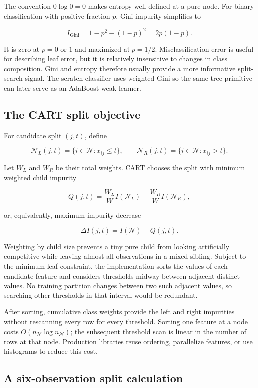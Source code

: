 \documentclass[11pt]{article}
\begin{document}
The convention $0\log 0=0$ makes entropy well defined at a pure node. For
binary classification with positive fraction $p$, Gini impurity simplifies to

\[
 I_{\mathrm{Gini}}=1-p^2-(1-p)^2=2p(1-p).
\]

It is zero at $p=0$ or $1$ and maximized at $p=1/2$. Misclassification error is
useful for describing leaf error, but it is relatively insensitive to changes
in class composition. Gini and entropy therefore usually provide a more
informative split-search signal. The scratch classifier uses weighted Gini so
the same tree primitive can later serve as an AdaBoost weak learner.

\subsection{The CART split objective}

For candidate split $(j,t)$, define

\[
 \mathcal N_L(j,t)=\{i\in\mathcal N:x_{ij}\leq t\},
 \qquad
 \mathcal N_R(j,t)=\{i\in\mathcal N:x_{ij}>t\}.
\]

Let $W_L$ and $W_R$ be their total weights. CART chooses the split with minimum
weighted child impurity

\[
 Q(j,t)=\frac{W_L}{W}I(\mathcal N_L)
       +\frac{W_R}{W}I(\mathcal N_R),
\]

or, equivalently, maximum impurity decrease

\[
 \Delta I(j,t)=I(\mathcal N)-Q(j,t).
\]

Weighting by child size prevents a tiny pure child from looking artificially
competitive while leaving almost all observations in a mixed sibling. Subject
to the minimum-leaf constraint, the implementation sorts the values of each
candidate feature and considers thresholds midway between adjacent distinct
values. No training partition changes between two such adjacent values, so
searching other thresholds in that interval would be redundant.

After sorting, cumulative class weights provide the left and right impurities
without rescanning every row for every threshold. Sorting one feature at a node
costs $O(n_{\mathcal N}\log n_{\mathcal N})$; the subsequent threshold scan is
linear in the number of rows at that node. Production libraries reuse ordering,
parallelize features, or use histograms to reduce this cost.

\subsection{A six-observation split calculation}
\end{document}

